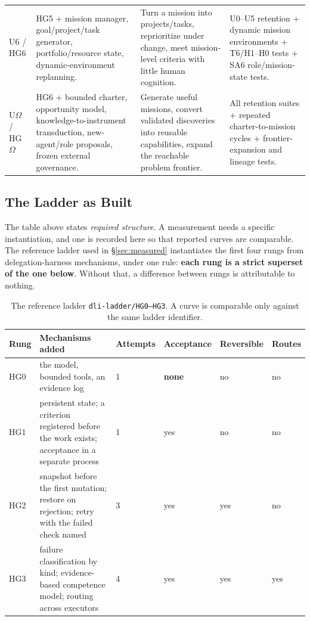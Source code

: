 \documentclass[11pt]{article}
\theoremstyle{definition}
\newcommand{\Om}{\ensuremath{\Omega}}
\begin{document}
\begin{table}[h]
\begin{tabularx}{\textwidth}{@{}p{}ZZZ@{}}
U6 / HG6 & HG5 + mission manager, goal/project/task generator, portfolio/resource state, dynamic-environment replanning. & Turn a mission into projects/tasks, reprioritize under change, meet mission-level criteria with little human cognition. & U0--U5 retention + dynamic mission environments + T6/H1--H0 tests + SA6 role/mission-state tests. \\
U\Om{} / HG\Om{} & HG6 + bounded charter, opportunity model, knowledge-to-instrument transduction, new-agent/role proposals, frozen external governance. & Generate useful missions, convert validated discoveries into reusable capabilities, expand the reachable problem frontier. & All retention suites + repeated charter-to-mission cycles + frontier-expansion and lineage tests. \\
\bottomrule
\end{tabularx}
\end{table}

\subsection{The Ladder as Built}\label{sec:built}

The table above states \emph{required structure}. A measurement needs a specific instantiation, and one is recorded here so that reported curves are comparable. The reference ladder used in \S\ref{sec:measured} instantiates the first four rungs from delegation-harness mechanisms, under one rule: \textbf{each rung is a strict superset of the one below}. Without that, a difference between rungs is attributable to nothing.

\begin{table}[h]
\centering\small
\begin{tabularx}{\textwidth}{@{}lYllll@{}}
\toprule
Rung & Mechanisms added & Attempts & Acceptance & Reversible & Routes \\
\midrule
HG0 & the model, bounded tools, an evidence log & 1 & \textbf{none} & no & no \\
HG1 & persistent state; a criterion registered before the work exists; acceptance in a separate process & 1 & yes & no & no \\
HG2 & snapshot before the first mutation; restore on rejection; retry with the failed check named & 3 & yes & yes & no \\
HG3 & failure classification by kind; evidence-based competence model; routing across executors & 4 & yes & yes & yes \\
\bottomrule
\end{tabularx}
\caption{The reference ladder \texttt{dli-ladder/HG0--HG3}. A curve is comparable only against the same ladder identifier.}
\end{table}
\end{document}
